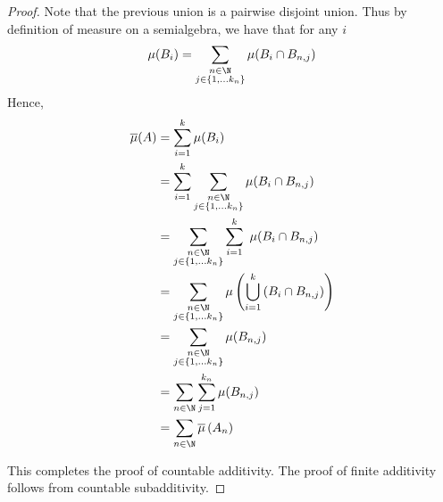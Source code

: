 \begin{proof}
    Note that the previous union is a pairwise disjoint union. Thus by definition of measure on a semialgebra, we have that for any $i$
    \begin{equation*}
	\mu (B_i) =\sum_{\substack{n\in \N \\ j\in \left\{ 1, \ldots k_n \right\}}} \mu (B_i \cap B_{n,j}) 
    \end{equation*}
    Hence, 
    \begin{align*}
	\overline \mu (A) &= \sum_{i=1}^{k} \mu (B_i ) \\
	&= \sum_{i=1}^{k} \sum_{\substack{n\in \N \\ j\in \left\{ 1, \ldots k_n \right\}}} \mu (B_i \cap B_{n,j}) \\
&= \sum_{\substack{n\in \N \\ j\in \left\{ 1, \ldots k_n \right\}}}\sum_{i=1}^{k} \ \mu (B_i \cap B_{n,j}) \\
&= \sum_{\substack{n\in \N \\ j\in \left\{ 1, \ldots k_n \right\}}} \mu \left( \bigcup_{i=1}^k \left( B_i \cap B_{n,j} \right) \right) \\
&= \sum_{\substack{n\in \N \\ j\in \left\{ 1, \ldots k_n \right\}}} \mu (B_{n,j}) \\
&= \sum_{n\in \N} \sum_{j=1}^{k_n} \mu (B_{n,j}) \\
&= \sum_{n\in \N} \overline \mu \left( A_n \right)
    \end{align*}
    
This completes the proof of countable additivity. The proof of finite additivity follows from countable subadditivity.
\end{proof}
